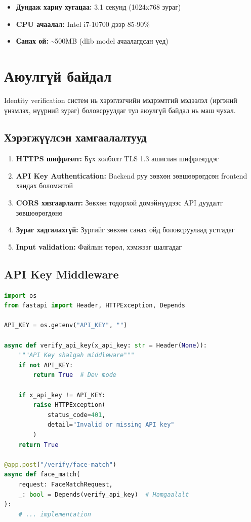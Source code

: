 \documentclass[12pt,a4paper]{article}
\begin{document}
\begin{itemize}[leftmargin=1cm]
  \item \textbf{Дундаж хариу хугацаа:} 3.1 секунд (1024x768 зураг)
  \item \textbf{CPU ачаалал:} Intel i7-10700 дээр 85-90\%
  \item \textbf{Санах ой:} \textasciitilde500MB (dlib model ачаалагдсан үед)
\end{itemize}

\section{Аюулгүй байдал}

Identity verification систем нь хэрэглэгчийн мэдрэмтгий мэдээлэл (иргэний үнэмлэх, нүүрний зураг) боловсруулдаг тул аюулгүй байдал нь маш чухал.

\subsection{Хэрэгжүүлсэн хамгаалалтууд}

\begin{enumerate}[leftmargin=1.2cm]
  \item \textbf{HTTPS шифрлэлт:} Бүх холболт TLS 1.3 ашиглан шифрлэгддэг
  \item \textbf{API Key Authentication:} Backend руу зөвхөн зөвшөөрөгдсөн frontend хандах боломжтой
  \item \textbf{CORS хязгаарлалт:} Зөвхөн тодорхой домэйнүүдээс API дуудалт зөвшөөрөгдөнө
  \item \textbf{Зураг хадгалахгүй:} Зургийг зөвхөн санах ойд боловсруулаад устгадаг
  \item \textbf{Input validation:} Файлын төрөл, хэмжээг шалгадаг
\end{enumerate}

\subsection{API Key Middleware}

\begin{lstlisting}[language=Python, caption={API Key Authentication}]
import os
from fastapi import Header, HTTPException, Depends

API_KEY = os.getenv("API_KEY", "")

async def verify_api_key(x_api_key: str = Header(None)):
    """API Key shalgah middleware"""
    if not API_KEY:
        return True  # Dev mode
    
    if x_api_key != API_KEY:
        raise HTTPException(
            status_code=401,
            detail="Invalid or missing API key"
        )
    return True

@app.post("/verify/face-match")
async def face_match(
    request: FaceMatchRequest,
    _: bool = Depends(verify_api_key)  # Hamgaalalt
):
    # ... implementation
\end{lstlisting}
\end{document}
